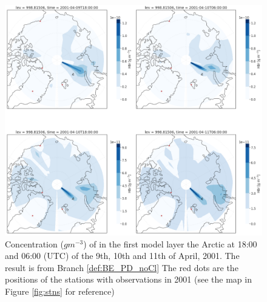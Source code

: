 \begin{figure}[h]
    \centering
    \includegraphics[width = \linewidth]{Chapter6_Results/images/Polar_StationComp_2001/HBr/polarHBr_noCl.png}
    \caption{Concentration ($g m^{-3}$) of  in the first model layer the Arctic at 18:00 and 06:00 (UTC) of the 9th, 10th and 11th of April, 2001. The result is from Branch \ref{def:BE_PD_noCl} The red dots are the positions of the stations with observations in 2001 (see the map in Figure \ref{fig:stns} for reference)}
    \label{fig:polarHBr_noCl}
\end{figure}